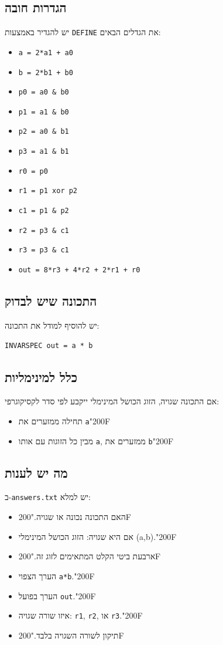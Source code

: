 \documentclass[11pt,a4paper]{article}
\newcommand{\RLM}{\char"200F}
\newenvironment{englishlisting}
  {\begin{english}\begin{flushleft}}
  {\end{flushleft}\end{english}}
\begin{document}
\subsection*{הגדרות חובה}
יש להגדיר באמצעות \texttt{DEFINE} את הגדלים הבאים:
\begin{itemize}
  \item \texttt{a = 2*a1 + a0}
  \item \texttt{b = 2*b1 + b0}
  \item \texttt{p0 = a0 \& b0}
  \item \texttt{p1 = a1 \& b0}
  \item \texttt{p2 = a0 \& b1}
  \item \texttt{p3 = a1 \& b1}
  \item \texttt{r0 = p0}
  \item \texttt{r1 = p1 xor p2}
  \item \texttt{c1 = p1 \& p2}
  \item \texttt{r2 = p3 \& c1}
  \item \texttt{r3 = p3 \& c1}
  \item \texttt{out = 8*r3 + 4*r2 + 2*r1 + r0}
\end{itemize}

\subsection*{התכונה שיש לבדוק}
יש להוסיף למודל את התכונה:
\begin{englishlisting}
\begin{lstlisting}
INVARSPEC out = a * b
\end{lstlisting}
\end{englishlisting}

\subsection*{כלל למינימליות}
אם התכונה שגויה, הזוג הכושל המינימלי ייקבע לפי סדר לקסיקוגרפי:
\begin{itemize}
  \item תחילה ממזערים את \texttt{a}\RLM
  \item מבין כל הזוגות עם אותו \texttt{a}, ממזערים את \texttt{b}\RLM
\end{itemize}

\subsection*{מה יש לענות}
ב-\texttt{answers.txt} יש למלא:
\begin{itemize}
  \item האם התכונה נכונה או שגויה.\RLM
  \item אם היא שגויה: הזוג הכושל המינימלי \textenglish{(a,b)}.\RLM
  \item ארבעת ביטי הקלט המתאימים לזוג זה.\RLM
  \item הערך הצפוי \texttt{a*b}.\RLM
  \item הערך בפועל \texttt{out}.\RLM
  \item איזו שורה שגויה: \texttt{r1}, \texttt{r2}, או \texttt{r3}.\RLM
  \item תיקון לשורה השגויה בלבד.\RLM
\end{itemize}
\end{document}
